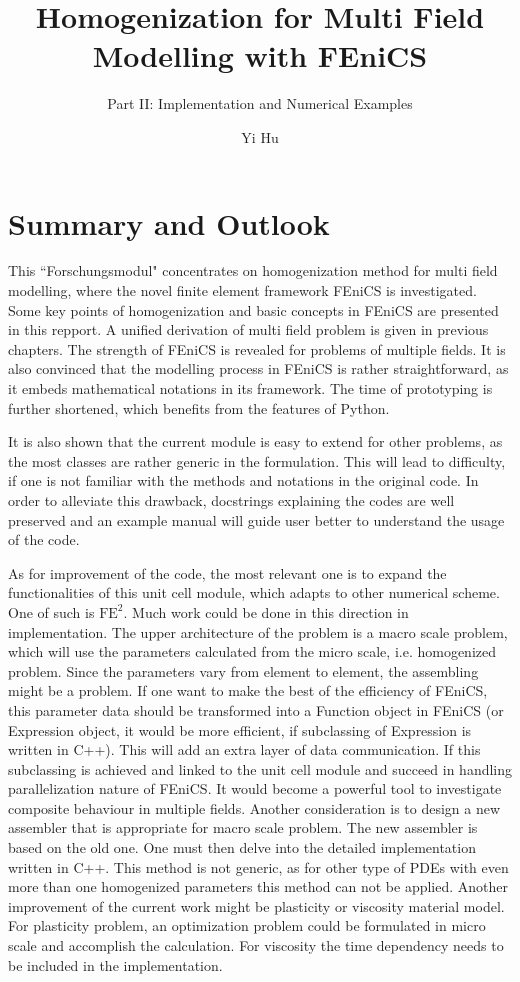 \documentclass[10pt,a4paper]{scrreprt}
\author{Yi Hu}
\title{Homogenization for Multi Field Modelling with FEniCS}
\subtitle{Part II: Implementation and Numerical Examples}
\begin{document}
\chapter{Summary and Outlook}
This ``Forschungsmodul" concentrates on homogenization method for multi field modelling, where the novel finite element framework FEniCS is investigated. Some key points of homogenization and basic concepts in FEniCS are presented in this repport. A unified derivation of multi field problem is given in previous chapters. The strength of FEniCS is revealed for problems of multiple fields. It is also convinced that the modelling process in FEniCS is rather straightforward, as it embeds mathematical notations in its framework. The time of prototyping is further shortened, which benefits from the features of Python.

It is also shown that the current module is easy to extend for other problems, as the most classes are rather generic in the formulation. This will lead to difficulty, if one is not familiar with the methods and notations in the original code. In order to alleviate this drawback, docstrings explaining the codes are well preserved and an example manual will guide user better to understand the usage of the code.

As for improvement of the code, the most relevant one is to expand the functionalities of this unit cell module, which adapts to other numerical scheme. One of such is $\text{FE}^{2}$. Much work could be done in this direction in implementation. The upper architecture of the problem is a macro scale problem, which will use the parameters calculated from the micro scale, i.e. homogenized problem. Since the parameters vary from element to element, the assembling might be a problem. If one want to make the best of the efficiency of FEniCS, this parameter data should be transformed into a Function object in FEniCS (or Expression object, it would be more efficient, if subclassing of Expression is written in C++). This will add an extra layer of data communication. If this subclassing is achieved and linked to the unit cell module and succeed in handling parallelization nature of FEniCS. It would become a powerful tool to investigate composite behaviour in multiple fields. Another consideration is to design a new assembler that is appropriate for macro scale problem. The new assembler is based on the old one. One must then delve into the detailed implementation written in C++. This method is not generic, as for other type of PDEs with even more than one homogenized parameters this method can not be applied. Another improvement of the current work might be plasticity or viscosity material model. For plasticity problem, an optimization problem could be formulated in micro scale and accomplish the calculation. For viscosity the time dependency needs to be included in the implementation.
\end{document}
